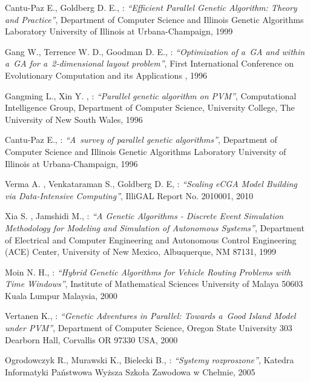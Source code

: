 

\begin{thebibliography}{99}

Cantu-Paz E., Goldberg D. E., : \textit{``Efficient Parallel Genetic Algorithm: Theory
and Practice''}, Department of Computer Science and Illinois Genetic Algorithms Laboratory
University of Illinois at Urbana-Champaign, 1999

Gang W., Terrence W. D., Goodman D. E., : \textit{``Optimization of a~GA and
within a~GA for a~2-dimensional layout problem''}, First International Conference on
Evolutionary Computation and its Applications , 1996

	Gangming L., Xin Y. , : \textit{``Parallel genetic algorithm on PVM''},
Computational Intelligence Group, Department of Computer Science,
University College, The University of New South Wales, 1996

	Cantu-Paz E., : \textit{``A~survey of parallel genetic algorithms''},
Department of Computer Science and Illinois Genetic Algorithms Laboratory
University of Illinois at Urbana-Champaign, 1996

	Verma A. , Venkataraman S., Goldberg D. E, : \textit{``Scaling eCGA Model
	Building via Data-Intensive Computing''},
IlliGAL Report No. 2010001, 2010

	Xia S. , Jamshidi M., : \textit{``A Genetic Algorithms - Discrete Event Simulation
  Methodology for Modeling and Simulation of Autonomous Systems''},
 Department of Electrical and Computer Engineering and Autonomous Control Engineering
 (ACE) Center, University of New Mexico, Albuquerque, NM 87131, 1999

	Moin N. H., : \textit{``Hybrid Genetic Algorithms for Vehicle Routing Problems
	with Time Windows''}, Institute of Mathematical Sciences University of Malaya
       50603 Kuala Lumpur Malaysia, 2000
	   
	Vertanen K., : \textit{``Genetic Adventures in Parallel: Towards a~Good Island Model under PVM''}, 
	Department of Computer Science, Oregon State University 303 Dearborn Hall,
	Corvallis OR 97330 USA, 2000

	Ogrodowczyk R., Murawski K., Bielecki B., : \textit{``Systemy rozproszone''}, 
	Katedra Informatyki Państwowa Wyższa Szkoła Zawodowa w Chełmie, 2005


\end{thebibliography}
